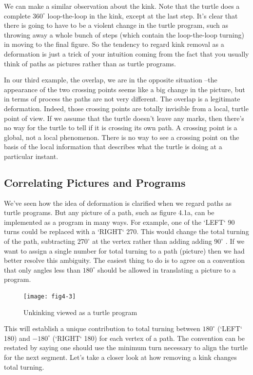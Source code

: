 \documentclass{book}
\begin{document}
We can make a similar observation about the kink. Note that the
turtle does a complete $360^{\circ}$ loop-the-loop in the kink, except at the last
step. It's clear that there is going to have to be a violent change in the
turtle program, such as throwing away a whole bunch of steps (which
contain the loop-the-loop turning) in moving to the final figure. So the
tendency to regard kink removal as a deformation is just a trick of your
intuition coming from the fact that you usually think of paths as pictures
rather than as turtle programs.

In our third example, the overlap, we are in the opposite situation --the appearance of the two crossing points seems like a big change in the
picture, but in terms of process the paths are not very different. The
overlap is a legitimate deformation. Indeed, those crossing points are
totally invisible from a local, turtle point of view. If we assume that the
turtle doesn't leave any marks, then there's no way for the turtle to tell
if it is crossing its own path. A crossing point is a global, not a local
phenomenon. There is no way to see a crossing point on the basis of the
local information that describes what the turtle is doing at a particular
instant.

\subsection{Correlating Pictures and Programs}

We've seen how the idea of deformation is clarified when we regard paths
as turtle programs. But any picture of a path, such as figure 4.1a, can
be implemented as a program in many ways. For example, one of the
\textsc{`LEFT`} 90 turns could be replaced with a \textsc{`RIGHT`} 270. This would change
the total turning of the path, subtracting $270^{\circ}$  at the vertex rather than
adding adding $90^{\circ}$ . If we want to assign a single number for total turning
to a path (picture) then we had better resolve this ambiguity.
The easiest thing to do is to agree on a convention that only angles
less than $180^{\circ}$ should be allowed in translating a picture to a program.

\begin{figure}
\begin{center}
\texttt{[image: fig4-3]}
\caption{Unkinking viewed as a turtle program}
\end{center}
\end{figure}

This will establish a unique contribution to total turning between $180^{\circ}$
(\textsc{`LEFT`} 180) and $-180^{\circ}$ (\textsc{`RIGHT`} 180) for each vertex of a path. The
convention can be restated by saying one should use the minimum turn
necessary to align the turtle for the next segment.
Let's take a closer look at how removing a kink changes total turning.
\end{document}
